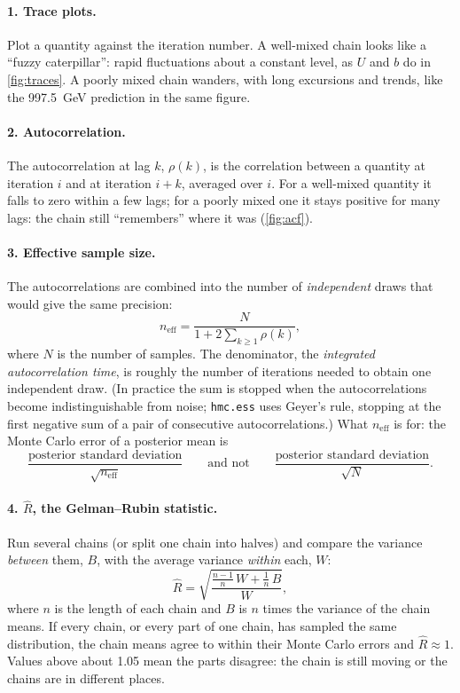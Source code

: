 \documentclass[11pt]{article}
\newcommand{\code}[1]{\texttt{#1}}
\begin{document}
\paragraph{1. Trace plots.} Plot a quantity against the iteration number. A well-mixed
chain looks like a ``fuzzy caterpillar'': rapid fluctuations about a constant level, as
$U$ and $b$ do in \cref{fig:traces}. A poorly mixed chain wanders, with long excursions
and trends, like the 997.5~GeV prediction in the same figure.

\paragraph{2. Autocorrelation.} The autocorrelation at lag $k$, $\rho(k)$, is the
correlation between a quantity at iteration $i$ and at iteration $i + k$, averaged over
$i$. For a well-mixed quantity it falls to zero within a few lags; for a poorly mixed one
it stays positive for many lags: the chain still ``remembers'' where it was
(\cref{fig:acf}).

\paragraph{3. Effective sample size.} The autocorrelations are combined into the number
of \emph{independent} draws that would give the same precision:
\begin{equation}
  n_\text{eff} = \frac{N}{1 + 2\sum_{k \ge 1} \rho(k)} ,
  \label{eq:ess}
\end{equation}
where $N$ is the number of samples. The denominator, the \emph{integrated autocorrelation
time}, is roughly the number of iterations needed to obtain one independent draw. (In
practice the sum is stopped when the autocorrelations become indistinguishable from
noise; \code{hmc.ess} uses Geyer's rule, stopping at the first negative sum of a pair of
consecutive autocorrelations.) What $n_\text{eff}$ is for: the Monte Carlo error of a
posterior mean is
\[
  \frac{\text{posterior standard deviation}}{\sqrt{n_\text{eff}}}
  \qquad\text{and not}\qquad
  \frac{\text{posterior standard deviation}}{\sqrt{N}} .
\]

\paragraph{4. $\hat R$, the Gelman--Rubin statistic.} Run several chains (or split one
chain into halves) and compare the variance \emph{between} them, $B$, with the average
variance \emph{within} each, $W$:
\begin{equation}
  \hat R = \sqrt{\frac{\tfrac{n-1}{n}\,W + \tfrac{1}{n}\,B}{W}} ,
  \label{eq:rhat}
\end{equation}
where $n$ is the length of each chain and $B$ is $n$ times the variance of the chain
means. If every chain, or every part of one chain, has sampled the same distribution, the
chain means agree to within their Monte Carlo errors and $\hat R \approx 1$. Values above
about 1.05 mean the parts disagree: the chain is still moving or the chains are in
different places.
\end{document}
